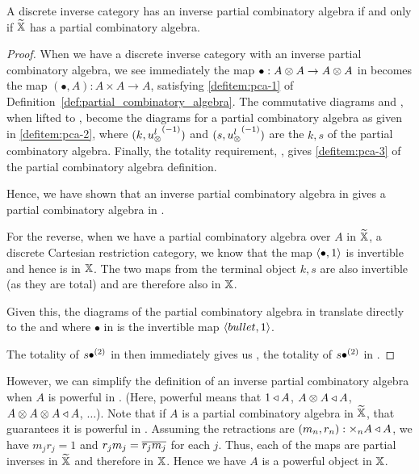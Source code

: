 \begin{proposition}\label{prop:inverse-pca-iff-pca}
  A discrete inverse category \X has an inverse partial combinatory algebra if and only if $\widetilde{\mathbb{X}}$ has
  a partial combinatory algebra.
\end{proposition}
\begin{proof}
  When we have a discrete inverse category \X with an inverse partial combinatory algebra, we see
  immediately the map $\bullet:A\otimes A\to A\otimes A$ in \X becomes the map $(\bullet,A):A\times A \to A$,
  satisfying \ref{defitem:pca-1} of Definition~\ref{def:partial_combinatory_algebra}. The
  commutative diagrams  and , when lifted to \Xt, become the diagrams
  for a partial combinatory algebra as given in \ref{defitem:pca-2}, where $(k,{u_{\otimes}^l}^{(-1)})$ and
  $(s,{u_{\otimes}^l}^{(-1)})$ are the $k,s$ of the partial combinatory algebra. Finally, the totality
  requirement, , gives \ref{defitem:pca-3} of the partial combinatory algebra
  definition.

  Hence, we have shown that an inverse partial combinatory algebra in \X gives a partial combinatory
  algebra in \Xt.

  For the reverse, when we have a partial combinatory algebra over $A$ in $\widetilde{\mathbb{X}}$, a discrete Cartesian
  restriction category, we know that the map $\langle\bullet,1\rangle$ is invertible and hence is in
  $\mathbb{X}$. The two maps from the terminal object $k,s$ are also invertible (as they are total) and are
  therefore also in $\mathbb{X}$.

  Given this, the diagrams of the partial combinatory algebra in \Xt translate directly to the
   and  where $\bullet$ in \X is the invertible map $\langle bullet,1\rangle$.

  The totality  of $s {\bullet}^{(2)}$ in \X then immediately gives us , the
  totality of $s {\bullet}^{(2)}$ in \X.


\end{proof}

However, we can simplify the definition of an inverse partial combinatory algebra when $A$ is
powerful in \X. (Here, powerful means that $1\triangleleft A$, $A\otimes A\triangleleft A$, $A\otimes A\otimes A\triangleleft A$,
$\ldots$). Note that if $A$ is a partial combinatory algebra in $\widetilde{\mathbb{X}}$, that guarantees it is
powerful in \Xt. Assuming the retractions are $(m_n,r_n): \times_n A \triangleleft A$, we have $m_j r_j =
1$ and $r_j m_j = \overline{r_j m_j}$ for each $j$. Thus, each of the maps are partial inverses in
$\widetilde{\mathbb{X}}$ and therefore in $\mathbb{X}$. Hence we have $A$ is a powerful object in $\mathbb{X}$.


